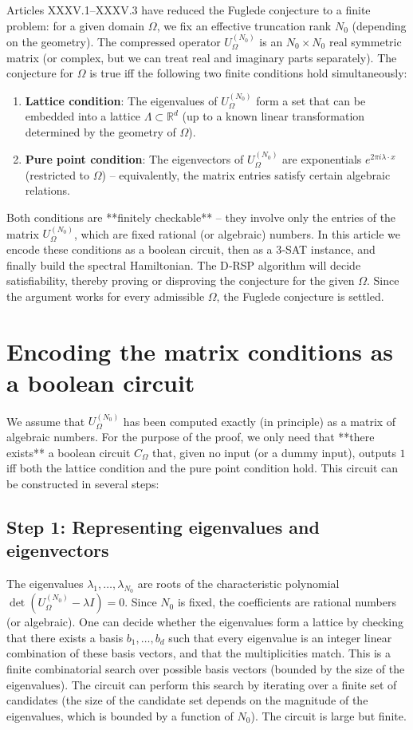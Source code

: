 \documentclass[11pt,a4paper]{article}
\begin{document}
Articles XXXV.1–XXXV.3 have reduced the Fuglede conjecture to a finite problem: for a given domain $\Omega$, we fix an effective truncation rank $N_0$ (depending on the geometry). The compressed operator $U_\Omega^{(N_0)}$ is an $N_0 \times N_0$ real symmetric matrix (or complex, but we can treat real and imaginary parts separately). The conjecture for $\Omega$ is true iff the following two finite conditions hold simultaneously:
\begin{enumerate}
\item \textbf{Lattice condition}: The eigenvalues of $U_\Omega^{(N_0)}$ form a set that can be embedded into a lattice $\Lambda \subset \mathbb{R}^d$ (up to a known linear transformation determined by the geometry of $\Omega$).
\item \textbf{Pure point condition}: The eigenvectors of $U_\Omega^{(N_0)}$ are exponentials $e^{2\pi i \lambda \cdot x}$ (restricted to $\Omega$) – equivalently, the matrix entries satisfy certain algebraic relations.
\end{enumerate}
Both conditions are **finitely checkable** – they involve only the entries of the matrix $U_\Omega^{(N_0)}$, which are fixed rational (or algebraic) numbers. In this article we encode these conditions as a boolean circuit, then as a 3‑SAT instance, and finally build the spectral Hamiltonian. The D‑RSP algorithm will decide satisfiability, thereby proving or disproving the conjecture for the given $\Omega$. Since the argument works for every admissible $\Omega$, the Fuglede conjecture is settled.

\section{Encoding the matrix conditions as a boolean circuit}

We assume that $U_\Omega^{(N_0)}$ has been computed exactly (in principle) as a matrix of algebraic numbers. For the purpose of the proof, we only need that **there exists** a boolean circuit $C_{\Omega}$ that, given no input (or a dummy input), outputs $1$ iff both the lattice condition and the pure point condition hold. This circuit can be constructed in several steps:

\subsection{Step 1: Representing eigenvalues and eigenvectors}

The eigenvalues $\lambda_1,\dots,\lambda_{N_0}$ are roots of the characteristic polynomial $\det(U_\Omega^{(N_0)} - \lambda I) = 0$. Since $N_0$ is fixed, the coefficients are rational numbers (or algebraic). One can decide whether the eigenvalues form a lattice by checking that there exists a basis $b_1,\dots,b_d$ such that every eigenvalue is an integer linear combination of these basis vectors, and that the multiplicities match. This is a finite combinatorial search over possible basis vectors (bounded by the size of the eigenvalues). The circuit can perform this search by iterating over a finite set of candidates (the size of the candidate set depends on the magnitude of the eigenvalues, which is bounded by a function of $N_0$). The circuit is large but finite.
\end{document}
